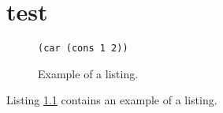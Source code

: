 \documentclass{report}
\begin{document}
\chapter{test}

\clearpage

\begin{figure}[H]
\texttt{(car (cons 1 2))}
\caption{Example of a listing.}
\label{lst:example}
\end{figure}

\clearpage

Listing \ref{lst:example} contains an example of a listing.
\end{document}

